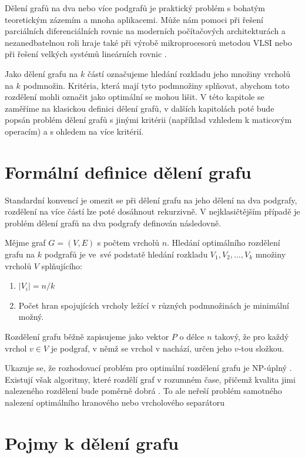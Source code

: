 \documentclass[11pt,american,czech,oneside]{book}
\theoremstyle{plain}
\theoremstyle{definition}
\begin{document}
Dělení grafů na dva nebo více podgrafů je praktický problém s bohatým teoretickým zázemím a mnoha aplikacemi. Může nám pomoci při řešení parciálních diferenciálních rovnic na moderních počítačových architekturách \cite{posl:90} a nezanedbatelnou roli hraje také při výrobě mikroprocesorů metodou VLSI nebo při řešení velkých systémů lineárních rovnic \cite{keli:70, pis:84}.

Jako dělení grafu na $k$ částí označujeme hledání rozkladu jeho množiny vrcholů na $k$ podmnožin. Kritéria, která mají tyto podmnožiny splňovat, abychom toto rozdělení mohli označit jako optimální se mohou lišit. V této kapitole se zaměříme na klasickou definici dělení grafů, v dalších kapitolách poté bude popsán problém dělení grafů s jinými kritérii (například vzhledem k maticovým operacím) a s ohledem na více kritérií.

\section{Formální definice dělení grafu}
Standardní konvencí je omezit se při dělení grafu na jeho dělení na dva podgrafy, rozdělení na více částí lze poté dosáhnout rekurzivně. V nejklasičtějším případě je problém dělení grafů na dva podgrafy definován následovně.

Mějme graf $G=(V,E)$ s počtem vrcholů $n$. Hledání optimálního rozdělení grafu na $k$ podgrafů je ve~své podstatě hledání rozkladu $V_1,V_2,\ldots,V_k$ množiny vrcholů $V$ splňujícího:
\begin{enumerate}
  \item $|V_i|=n/k$
  \item Počet hran spojujících vrcholy ležící v různých podmnožinách je minimální možný.
\end{enumerate}
Rozdělení grafu běžně zapisujeme jako vektor $P$ o délce $n$ takový, že pro každý vrchol $v \in V$ je podgraf, v němž se vrchol v nachází, určen jeho $v$-tou složkou.

Ukazuje se, že rozhodovací problém pro optimální rozdělení grafu je NP-úplný \cite{gajo:79}. Existují však algoritmy, které rozdělí graf v rozumném čase, přičemž kvalita jimi nalezeného rozdělení bude poměrně dobrá \cite{lita:79}. To ale neřeší problém samotného nalezení optimálního hranového nebo vrcholového separátoru \cite{liu:89}

\section{Pojmy k dělení grafu}
\end{document}

